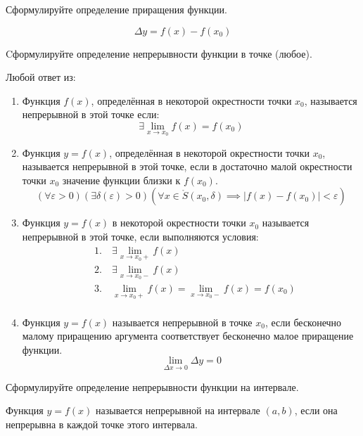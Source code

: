 \begin{question}
  Сформулируйте определение приращения функции. 
\end{question}
\begin{answer}
  \[
  \Delta y = f(x) - f(x_0)
  \] 
\end{answer}

\begin{question}
  Cформулируйте определение непрерывности функции в точке (любое). 
\end{question}
\begin{answer}
  Любой ответ из:
  \begin{enumerate}
    \item Функция $f(x)$, определённая в некоторой окрестности точки $x_0$, называется непрерывной в этой точке если: \[
        \exists \lim_{x \to x_0} f(x) = f(x_0)
      \]
  
    \item Функция $y = f(x)$, определённая в некоторой окрестности точки $x_0$, называется непрерывной в этой точке, если в достаточно малой окрестности точки $x_0$ значение функции близки к $f(x_0)$.
      \[
        (\forall  \varepsilon > 0)(\exists \delta(\varepsilon) > 0)(\forall x \in \mathring{S}(x_0, \delta) \implies |f(x) - f(x_0)| < \varepsilon)
      \]
    
    \item Функция $y = f(x)$ в некоторой окрестности точки $x_0$ называется непрерывной в этой точке, если выполняются условия:
      \begin{align*}
        &1. \quad \exists \lim_{x \to x_0+} f(x) \\
        &2. \quad \exists \lim_{x \to x_0-} f(x) \\
        &3. \quad \lim_{x \to x_0+} f(x) = \lim_{x \to x_0-} f(x) = f(x_0) \\
      \end{align*}

    \item Функция $y = f(x)$ называется непрерывной в точке $x_0$, если бесконечно малому приращению аргумента соответствует бесконечно малое приращение функции. \[
      \lim_{\Delta x \to 0} \Delta y = 0
    \] 
  \end{enumerate}
\end{answer}

\begin{question}
  Сформулируйте определение непрерывности функции на интервале.
\end{question}
\begin{answer}
  Функция $y = f(x)$ называется непрерывной на интервале $(a, b)$, если она непрерывна в каждой точке этого интервала.
\end{answer}


